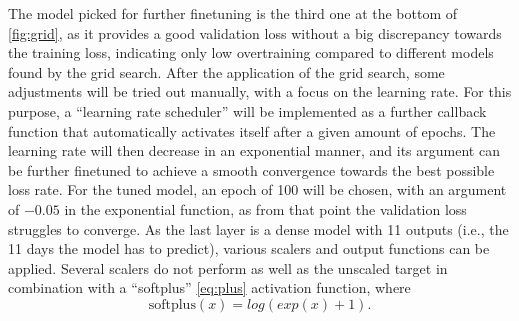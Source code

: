 The model picked for further finetuning is the third one at the bottom of \ref{fig:grid}, as it provides a good validation loss without a big discrepancy towards the training loss, indicating only low overtraining compared to different models found by the grid search.
After the application of the grid search, some adjustments will be tried out manually, with a focus on the learning rate. For this purpose, a \enquote{learning rate scheduler} will be implemented as a further callback function that automatically activates itself after a given amount of epochs. The learning rate will then decrease in an exponential manner, and its argument can be further finetuned to achieve a smooth convergence towards the best possible loss rate. For the tuned model, an epoch of 100 will be chosen, with an argument of $-0.05$ in the exponential function, as from that point the validation loss struggles to converge.
As the last layer is a dense model with 11 outputs (i.e., the 11 days the model has to predict), various scalers and output functions can be applied. 
Several scalers do not perform as well as the unscaled target in combination with a \enquote{softplus} \eqref{eq:plus} activation function, where
\begin{equation}
\label{eq:plus}
    \text{softplus}(x) = log(exp(x) + 1) .
\end{equation}


